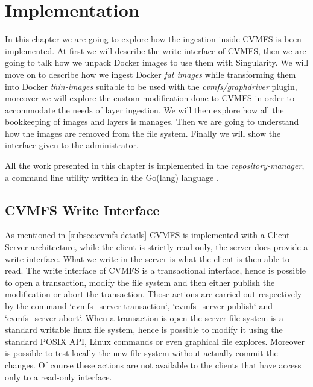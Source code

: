 \chapter{Implementation}\label{ch:Implementation}

In this chapter we are going to explore how the ingestion inside CVMFS is been
implemented. At first we will describe the write interface of CVMFS, then we
are going to talk how we unpack Docker images to use them with Singularity. We
will move on to describe how we ingest Docker \textit{fat images} while
transforming them into Docker \textit{thin-images} suitable to be used with the
\textit{cvmfs/graphdriver} plugin, moreover we will explore the custom
modification done to CVMFS in order to accommodate the needs of layer
ingestion. We will then explore how all the bookkeeping of images and layers is
manages.  Then we are going to understand how the images are removed from the
file system. Finally we will show the interface given to the administrator.

All the work presented in this chapter is implemented in the
\textit{repository-manager}, a command line utility written in the Go(lang)
language \cite{repository-manager}.

\section{CVMFS Write Interface}

As mentioned in \ref{subsec:cvmfs-details} CVMFS is implemented with a
Client-Server architecture, while the client is strictly read-only, the server
does provide a write interface. What we write in the server is what the client
is then able to read.  The write interface of CVMFS is a transactional
interface, hence is possible to open a transaction, modify the file system and
then either publish the modification or abort the transaction. Those actions
are carried out respectively by the command `cvmfs\_server transaction`,
`cvmfs\_server publish` and `cvmfs\_server abort`. 
When a transaction is open the server file system is a standard writable linux
file system, hence is possible to modify it using the standard POSIX API, Linux
commands or even graphical file explores.  Moreover is possible to test locally
the new file system without actually commit the changes. Of course these
actions are not available to the clients that have access only to a read-only
interface. 

